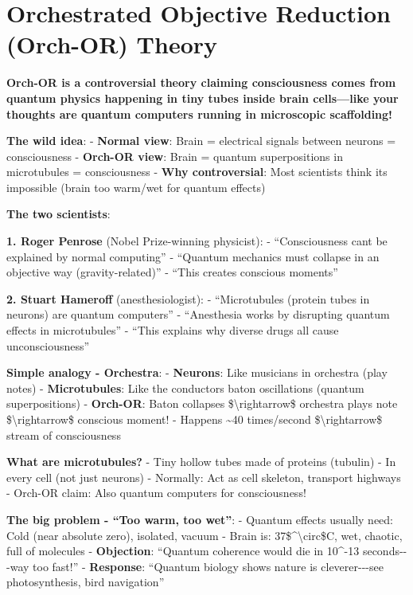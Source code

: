 \chapter{Orchestrated Objective Reduction (Orch-OR) Theory}
\label{ch:orch-or}

\begin{nontechnical}
\textbf{Orch-OR is a controversial theory claiming consciousness comes from quantum physics happening in tiny tubes inside brain cells---like your thoughts are quantum computers running in microscopic scaffolding!}

\textbf{The wild idea}: - \textbf{Normal view}: Brain = electrical
signals between neurons = consciousness - \textbf{Orch-OR view}: Brain =
quantum superpositions in microtubules = consciousness - \textbf{Why
controversial}: Most scientists think it\textquotesingle s impossible
(brain too warm/wet for quantum effects)

\textbf{The two scientists}:

\textbf{1. Roger Penrose} (Nobel Prize-winning physicist): -
``Consciousness can\textquotesingle t be explained by normal computing''
- ``Quantum mechanics must collapse in an objective way
(gravity-related)'' - ``This creates conscious moments''

\textbf{2. Stuart Hameroff} (anesthesiologist): - ``Microtubules
(protein tubes in neurons) are quantum computers'' - ``Anesthesia works
by disrupting quantum effects in microtubules'' - ``This explains why
diverse drugs all cause unconsciousness''

\textbf{Simple analogy - Orchestra}: - \textbf{Neurons}: Like musicians
in orchestra (play notes) - \textbf{Microtubules}: Like the
conductor\textquotesingle s baton oscillations (quantum superpositions)
- \textbf{Orch-OR}: Baton collapses \$\textbackslash rightarrow\$
orchestra plays note \$\textbackslash rightarrow\$ conscious moment! -
Happens \textasciitilde40 times/second \$\textbackslash rightarrow\$
stream of consciousness

\textbf{What are microtubules?} - Tiny hollow tubes made of proteins
(tubulin) - In every cell (not just neurons) - Normally: Act as cell
skeleton, transport highways - Orch-OR claim: Also quantum computers for
consciousness!

\textbf{The big problem - ``Too warm, too wet''}: - Quantum effects
usually need: Cold (near absolute zero), isolated, vacuum - Brain is:
37\$\^{}\textbackslash circ\$C, wet, chaotic, full of molecules -
\textbf{Objection}: ``Quantum coherence would die in 10\^{}-13
seconds-\/-\/-way too fast!'' - \textbf{Response}: ``Quantum biology
shows nature is cleverer-\/-\/-see photosynthesis, bird navigation''


\end{nontechnical}
